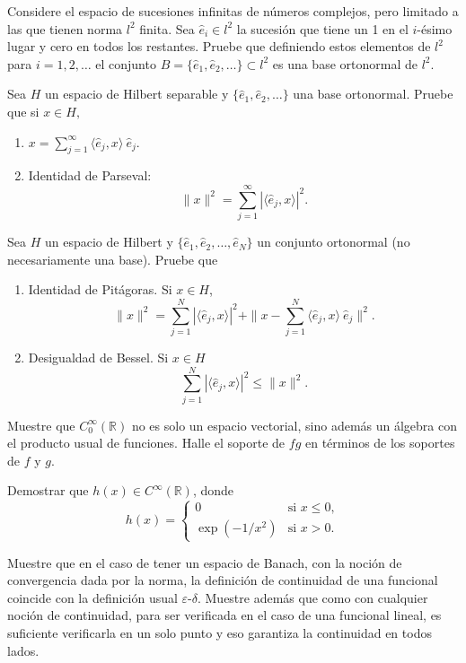 \documentclass[11pt,spanish]{article}
\begin{document}
\prob Considere el espacio de sucesiones infinitas de números complejos, pero
limitado a las que tienen norma $l^2$ finita. Sea $\hat e_i \in l^2$ la sucesión
que tiene un 1 en el $i$-ésimo lugar y cero en todos los restantes. Pruebe que
definiendo estos elementos de $l^2$ para $i=1, 2, \dots$ el conjunto $B=\{\hat
e_1, \hat e_2, \dots\}\subset l^2$ es una base ortonormal de $l^2$.

\prob Sea $H$ un espacio de Hilbert separable y $\{\hat e_1, \hat e_2,
\dots\}$ una base ortonormal. Pruebe que si $x\in H,$
\begin{enumerate}
\item $\displaystyle{x = \sum_{j=1}^\infty \langle \hat e_j, x\rangle~\hat e_j}$.
\item Identidad de Parseval:
\[
\|x\|^2 = \sum_{j=1}^\infty |\langle \hat e_j,x\rangle|^2.
\]
\end{enumerate}


\prob Sea $H$ un espacio de Hilbert y $\{\hat e_1, \hat e_2,
\dots, \hat e_N\}$ un conjunto ortonormal (no necesariamente una base). Pruebe que
\begin{enumerate}
\item Identidad de Pitágoras. Si $x\in H$,
\[
\|x\|^2 = \sum_{j=1}^N |\langle \hat e_j, x\rangle|^2 + \|x- \sum_{j=1}^N
\langle \hat e_j, x\rangle~\hat e_j \|^2.
\]
\item Desigualdad de Bessel. Si $x\in H$
\[
\sum_{j=1}^N |\langle \hat e_j, x\rangle|^2 \le \|x\|^2.
\]
\end{enumerate}


\prob Muestre que $C_0^\infty(\mathbb{R})$ no es solo un espacio vectorial, sino además un álgebra con el producto usual de funciones. Halle el soporte de $fg$ en términos de los soportes de $f$ y $g$.

\prob Demostrar que $h(x)\in C^\infty(\mathbb{R})$, donde
$$h(x)=\left\{\begin{array}{ll}
        0 & \text{si } x\leq 0,\\
        \exp(-1/x^2) & \text{si } x>0.
        \end{array}\right.
$$

\prob Muestre que en el caso de tener un espacio de Banach, con la noción de convergencia dada por la norma, la definición de continuidad de una funcional coincide con la definición usual $\varepsilon$-$\delta$. Muestre además que como con cualquier noción de continuidad, para ser verificada en el caso de una funcional lineal, es suficiente verificarla en un solo punto y eso garantiza la continuidad en todos lados.
\end{document}
